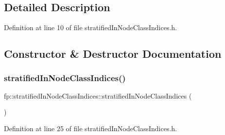 \subsection{Detailed Description}


Definition at line 10 of file stratified\+In\+Node\+Class\+Indices.\+h.



\subsection{Constructor \& Destructor Documentation}
\mbox{\label{classfp_1_1stratifiedInNodeClassIndices_a41dd9148191e93d4cae66ddac33a4248}} 
\subsubsection{\texorpdfstring{stratified\+In\+Node\+Class\+Indices()}{stratifiedInNodeClassIndices()}\hspace{0.1cm}{\footnotesize\ttfamily [1/2]}}
{\footnotesize\ttfamily fp\+::stratified\+In\+Node\+Class\+Indices\+::stratified\+In\+Node\+Class\+Indices (\begin{DoxyParamCaption}{ }\end{DoxyParamCaption})\hspace{0.3cm}{\ttfamily [inline]}}



Definition at line 25 of file stratified\+In\+Node\+Class\+Indices.\+h.


